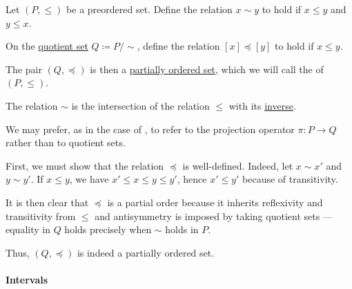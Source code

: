 \begin{definition}\label{def:antisymmetric_quotient}\mimprovised
  Let \( (P, \leq) \) be a preordered set. Define the relation \( x \sim y \) to hold if \( x \leq y \) and \( y \leq x \).

  On the \hyperref[def:equivalence_relation/quotient]{quotient set} \( Q \coloneqq P / {\sim} \), define the relation \( [x] \preceq [y] \) to hold if \( x \leq y \).

  The pair \( (Q, \preceq) \) is then a \hyperref[def:partially_ordered_set]{partially ordered set}, which we will call the  of \( (P, \leq) \).
\end{definition}
\begin{comments}
  \item The relation \( \sim \) is the intersection of the relation \( \leq \) with its \hyperref[def:binary_relation/inverse]{inverse}.
  \item We may prefer, as in the case of , to refer to the projection operator \( \pi: P \to Q \) rather than to quotient sets.
\end{comments}
\begin{defproof}
  First, we must show that the relation \( \preceq \) is well-defined. Indeed, let \( x \sim x' \) and \( y \sim y' \). If \( x \leq y \), we have \( x' \leq x \leq y \leq y' \), hence \( x' \leq y' \) because of transitivity.

  It is then clear that \( \preceq \) is a partial order because it inherits reflexivity and transitivity from \( \leq \) and antisymmetry is imposed by taking quotient sets --- equality in \( Q \) holds precisely when \( {\sim} \) holds in \( P \).

  Thus, \( (Q, \preceq) \) is indeed a partially ordered set.
\end{defproof}

\paragraph{Intervals}


